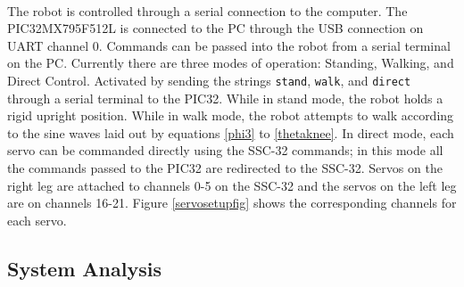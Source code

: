 \documentclass[titlepage,letterpaper,12pt]{article}
\begin{document}
\paragraph{}The robot is controlled through a serial connection to the computer.
The PIC32MX795F512L is connected to the PC through the USB connection on UART
channel 0. Commands can be passed into the robot from a serial terminal on the
PC. Currently there are three modes of operation: Standing, Walking, and Direct
Control. Activated by sending the strings \verb!stand!, \verb!walk!, and
\verb!direct! through a serial terminal to the PIC32. While in stand mode, the
robot holds a rigid upright position. While in walk mode, the robot attempts to
walk according to the sine waves laid out by equations \ref{phi3} to
\ref{thetaknee}. In direct mode, each servo can be commanded directly using
the SSC-32 commands; in this mode all the commands passed to the PIC32 are
redirected to the SSC-32. Servos on the right leg are attached to channels 0-5
on the SSC-32 and the servos on the left leg are on channels 16-21. Figure
\ref{servosetupfig} shows the corresponding channels for each servo.

\subsection{System Analysis}
\end{document}
